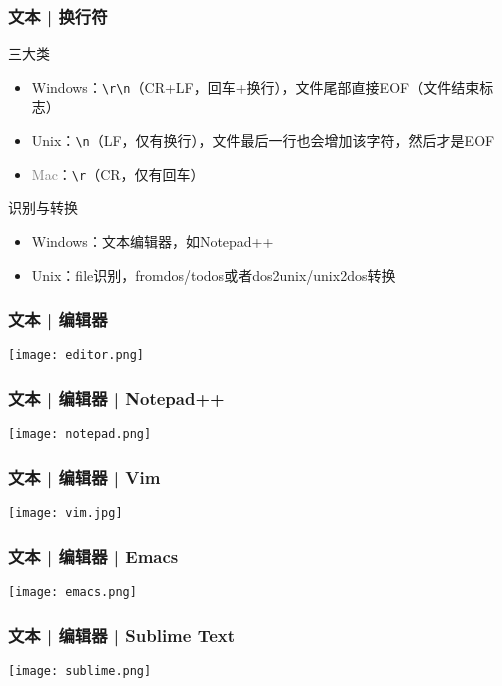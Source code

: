\begin{frame}[fragile]
  \frametitle{文本 | 换行符}
  \begin{block}{三大类}
    \begin{itemize}
      \item Windows：\verb|\r\n|（CR+LF，回车+换行），文件尾部直接EOF（文件结束标志）
      \item Unix：\verb|\n|（LF，仅有换行），文件最后一行也会增加该字符，然后才是EOF
      \item \textcolor{gray}{Mac}：\verb|\r|（CR，仅有回车）
    \end{itemize}
  \end{block}
  \pause
  \begin{block}{识别与转换}
    \begin{itemize}
      \item Windows：文本编辑器，如Notepad++
      \item Unix：file识别，fromdos/todos或者dos2unix/unix2dos转换
    \end{itemize}
  \end{block}
\end{frame}

\begin{frame}
  \frametitle{文本 | 编辑器}
    \begin{center}
      \texttt{[image: editor.png]}
    \end{center}
\end{frame}

\begin{frame}
  \frametitle{文本 | 编辑器 | Notepad++}
    \begin{center}
      \texttt{[image: notepad.png]}
    \end{center}
\end{frame}

\begin{frame}
  \frametitle{文本 | 编辑器 | Vim}
    \begin{center}
      \texttt{[image: vim.jpg]}
    \end{center}
\end{frame}

\begin{frame}
  \frametitle{文本 | 编辑器 | Emacs}
    \begin{center}
      \texttt{[image: emacs.png]}
    \end{center}
\end{frame}

\begin{frame}
  \frametitle{文本 | 编辑器 | Sublime Text}
    \begin{center}
      \texttt{[image: sublime.png]}
    \end{center}
\end{frame}

